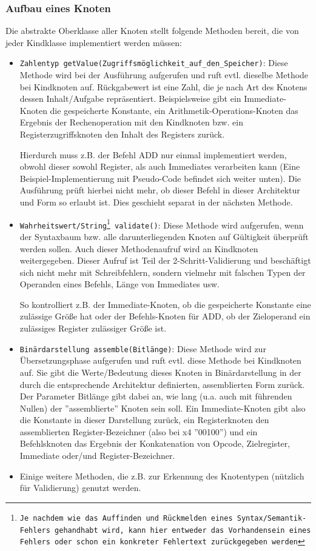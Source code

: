 \subsubsection{Aufbau eines Knoten}
Die abstrakte Oberklasse aller Knoten stellt folgende Methoden bereit, die von jeder Kindklasse implementiert werden müssen:
\begin{itemize}
  \item \texttt{Zahlentyp getValue(Zugriffsmöglichkeit\_auf\_den\_Speicher)}: Diese Methode wird bei der Ausführung aufgerufen und ruft evtl. dieselbe Methode bei Kindknoten auf. Rückgabewert ist eine Zahl, die je nach Art des Knotens dessen Inhalt/Aufgabe repräsentiert. Beispielsweise gibt ein Immediate-Knoten die gespeicherte Konstante, ein Arithmetik-Operations-Knoten das Ergebnis der Rechenoperation mit den Kindknoten bzw. ein Registerzugriffsknoten den Inhalt des Registers zurück.

  Hierdurch muss z.B. der Befehl ADD nur einmal implementiert werden, obwohl dieser sowohl Register, als auch Immediates verarbeiten kann (Eine Beispiel-Implementierung mit Pseudo-Code befindet sich weiter unten). Die Ausführung prüft hierbei nicht mehr, ob dieser Befehl in dieser Architektur und Form so erlaubt ist. Dies geschieht separat in der nächsten Methode.

  \item \texttt{Wahrheitswert/String\footnote{Je nachdem wie das Auffinden und Rückmelden eines Syntax/Semantik-Fehlers gehandhabt wird, kann hier entweder das Vorhandensein eines Fehlers oder schon ein konkreter Fehlertext zurückgegeben werden} validate()}: Diese Methode wird aufgerufen, wenn der Syntaxbaum bzw. alle darunterliegenden Knoten auf Gültigkeit überprüft werden sollen. Auch dieser Methodenaufruf wird an Kindknoten weitergegeben. Dieser Aufruf ist Teil der 2-Schritt-Validierung und beschäftigt sich nicht mehr mit Schreibfehlern, sondern vielmehr mit falschen Typen der Operanden eines Befehls, Länge von Immediates usw.

  So kontrolliert z.B. der Immediate-Knoten, ob die gespeicherte Konstante eine zulässige Größe hat oder der Befehls-Knoten für ADD, ob der Zieloperand ein zulässiges Register zulässiger Größe ist.
  
  \item \texttt{Binärdarstellung assemble(Bitlänge)}: Diese Methode wird zur Übersetzungsphase aufgerufen und ruft evtl. diese Methode bei Kindknoten auf. Sie gibt die Werte/Bedeutung dieses Knoten in Binärdarstellung in der durch die entsprechende Architektur definierten, assemblierten Form zurück. Der Parameter Bitlänge gibt dabei an, wie lang (u.a. auch mit führenden Nullen) der ''assemblierte'' Knoten sein soll. Ein Immediate-Knoten gibt also die Konstante in dieser Darstellung zurück, ein Registerknoten den assemblierten Register-Bezeichner (also bei x4 ''00100'') und ein Befehlsknoten das Ergebnis der Konkatenation von Opcode, Zielregister, Immediate oder/und Register-Bezeichner. 

  \item Einige weitere Methoden, die z.B. zur Erkennung des Knotentypen (nützlich für Validierung) genutzt werden.
\end{itemize}

